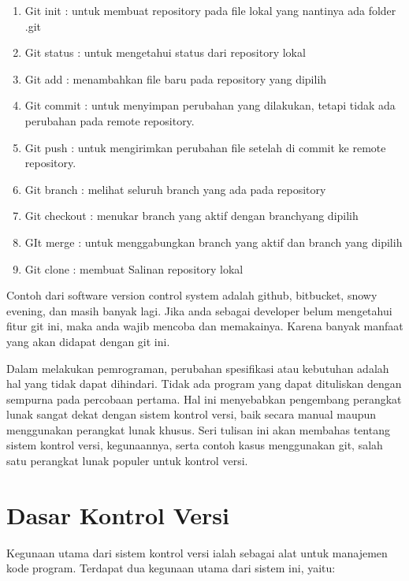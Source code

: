 \begin{enumerate}
\item Git init : untuk membuat repository pada file lokal yang nantinya 
ada folder .git
\item Git status : untuk mengetahui status dari repository lokal
\item Git add : menambahkan file baru pada repository yang dipilih
\item Git commit : untuk menyimpan perubahan yang dilakukan, tetapi 
tidak ada perubahan pada remote repository.
\item Git push : untuk mengirimkan perubahan file setelah di commit ke 
remote repository.
\item Git branch : melihat seluruh branch yang ada pada repository
\item Git checkout : menukar branch yang aktif dengan branchyang dipilih
\item GIt merge : untuk menggabungkan branch yang aktif dan branch yang 
dipilih
\item Git clone : membuat Salinan repository lokal
\setcounter{numberedCntE}{\theenumi}
\end{enumerate}
Contoh dari software version control system adalah github, bitbucket, 
snowy evening, dan masih banyak lagi. Jika anda sebagai developer belum 
mengetahui fitur git ini, maka anda wajib mencoba dan memakainya. Karena 
banyak manfaat yang akan didapat dengan git ini.
\vspace{12pt}

Dalam melakukan pemrograman, perubahan spesifikasi atau kebutuhan adalah 
hal yang tidak dapat dihindari. Tidak ada program yang dapat dituliskan 
dengan sempurna pada percobaan pertama. Hal ini menyebabkan pengembang 
perangkat lunak sangat dekat dengan sistem kontrol versi, baik secara 
manual maupun menggunakan perangkat lunak khusus. Seri tulisan ini akan 
membahas tentang sistem kontrol versi, kegunaannya, serta contoh kasus 
menggunakan git, salah satu perangkat lunak populer untuk kontrol versi.

\section{Dasar Kontrol Versi}

Kegunaan utama dari sistem kontrol versi ialah sebagai alat untuk 
manajemen kode program. Terdapat dua kegunaan utama dari sistem ini, 
yaitu:


